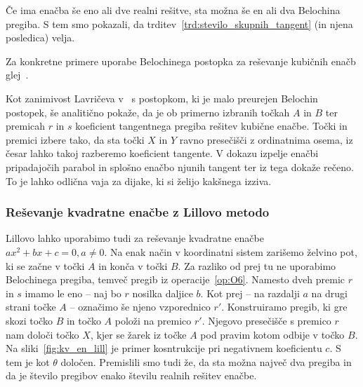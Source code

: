 Če ima enačba še eno ali dve realni rešitve, sta možna še en ali dva Belochina pregiba. S tem smo pokazali, da trditev~\ref{trd:stevilo_skupnih_tangent} (in njena posledica) velja.



Za konkretne primere uporabe Belochinega postopka za reševanje kubičnih enačb glej~\cite[38--44]{zore2022}.

Kot zanimivost Lavričeva v~\cite[str.\ 10--13]{lavric2013} s postopkom, ki je malo preurejen Belochin postopek, še analitično pokaže, da je ob primerno izbranih točkah $A$ in $B$ ter premicah $r$ in $s$ koeficient tangentnega pregiba rešitev kubične enačbe. Točki in premici izbere tako, da sta točki $X$ in $Y$ ravno presečišči z ordinatnima osema, iz česar lahko takoj razberemo koeficient tangente. V dokazu izpelje enačbi pripadajočih parabol in splošno enačbo njunih tangent ter iz tega dokaže rečeno. To je lahko odlična vaja za dijake, ki si želijo kakšnega izziva.

\subsubsection{Reševanje kvadratne enačbe z Lillovo metodo}
\label{podpodl:kvadr_en_lill}

Lillovo lahko uporabimo tudi za reševanje kvadratne enačbe $a x^2 + b x + c = 0, a \neq 0$. Na enak način v koordinatni sistem zarišemo želvino pot, ki se začne v točki $A$ in konča v točki $B$. Za razliko od prej tu ne uporabimo Belochinega pregiba, temveč pregib iz operacije~\ref{op:O6}. Namesto dveh premic $r$ in $s$ imamo le eno -- naj bo $r$ nosilka daljice $b$. Kot prej -- na razdalji $a$ na drugi strani točke $A$ -- označimo še njeno vzporednico $r'$. Konstruiramo pregib, ki gre skozi točko $B$ in točko $A$ položi na premico $r'$. Njegovo presečišče s premico $r$ nam določi točko $X$, kjer se žarek iz točke $A$ pod pravim kotom odbije v točko $B$. Na sliki~\ref{fig:kv_en_lill} je primer kosntrukcije pri negativnem koeficientu $c$. S tem je kot $\theta$ določen. Premislili smo tudi že, da sta možna največ dva pregiba in da je število pregibov enako številu realnih rešitev enačbe.

